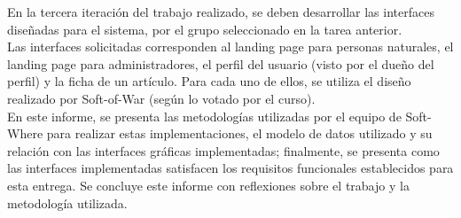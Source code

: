 En la tercera iteración del trabajo realizado, se deben desarrollar las interfaces diseñadas para el sistema, por el grupo seleccionado en la tarea anterior. \\
Las interfaces solicitadas corresponden al landing page para personas naturales, el landing page para administradores, el perfil del usuario (visto por el dueño del perfil) y la ficha de un artículo. Para cada uno de ellos, se utiliza el diseño realizado por Soft-of-War (según lo votado por el curso). \\
En este informe, se presenta las metodologías utilizadas por el equipo de Soft-Where para realizar estas implementaciones, el modelo de datos utilizado y su relación con las interfaces gráficas implementadas; finalmente, se presenta como las interfaces implementadas satisfacen los requisitos funcionales establecidos para esta entrega. 
Se concluye este informe con reflexiones sobre el trabajo y la metodología utilizada.